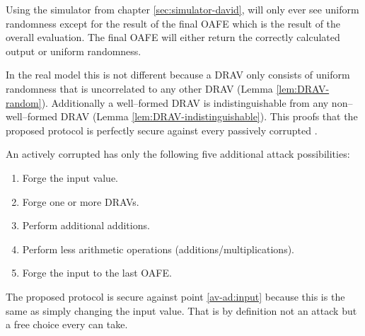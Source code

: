 
Using the simulator from chapter \ref{sec:simulator-david}, \JWpTwo{} will only
ever see uniform randomness except for the result of the final OAFE which is the
result of the overall evaluation. The final OAFE will either
return the correctly calculated output or uniform randomness.

In the real model this is not different because a DRAV only consists of uniform
randomness that is uncorrelated to any other DRAV (Lemma \ref{lem:DRAV-random}).
Additionally a well--formed DRAV is indistinguishable from any non--well--formed
DRAV (Lemma \ref{lem:DRAV-indistinguishable}). This proofs that the proposed
protocol is perfectly secure against every passively corrupted \JWpTwo{}.

An actively corrupted \JWpTwo{} has only the following five additional attack
possibilities:

\begin{enumerate}

\item \label{av-ad:input} Forge the input value.

\item \label{av-ad:DRAV} Forge one or more DRAVs.

\item \label{av-ad:other-ops} Perform additional additions.

\item \label{av-ad:less-ops} Perform less arithmetic operations
  (additions/multiplications).

\item \label{av-ad:last-OAFE} Forge the input to the last OAFE.

\end{enumerate}


The proposed protocol is secure against point \ref{av-ad:input} because this is
the same as simply changing the input value. That is by definition not an attack
but a free choice every \JWpTwo{} can take.

